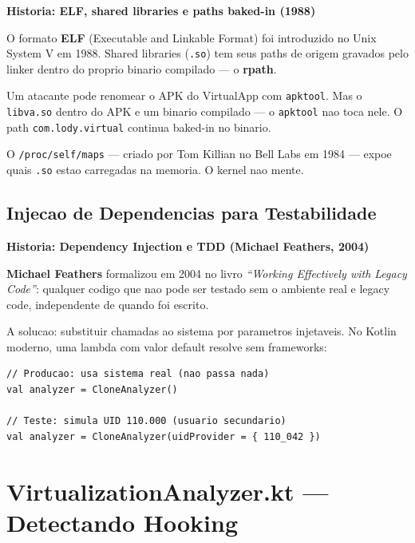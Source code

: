 \documentclass[12pt,a4paper]{article}
\begin{document}
\begin{historybox}
\textbf{Historia: ELF, shared libraries e paths baked-in (1988)}

O formato \textbf{ELF} (Executable and Linkable Format) foi introduzido
no Unix System V em 1988. Shared libraries (\texttt{.so}) tem seus paths
de origem gravados pelo linker dentro do proprio binario compilado --- o \textbf{rpath}.

Um atacante pode renomear o APK do VirtualApp com \texttt{apktool}.
Mas o \texttt{libva.so} dentro do APK e um binario compilado --- o \texttt{apktool}
nao toca nele. O path \texttt{com.lody.virtual} continua baked-in no binario.

O \texttt{/proc/self/maps} --- criado por Tom Killian no Bell Labs em 1984 ---
expoe quais \texttt{.so} estao carregadas na memoria. O kernel nao mente.
\end{historybox}

\subsection{Injecao de Dependencias para Testabilidade}

\begin{historybox}
\textbf{Historia: Dependency Injection e TDD (Michael Feathers, 2004)}

\textbf{Michael Feathers} formalizou em 2004 no livro \textit{``Working Effectively
with Legacy Code''}: qualquer codigo que nao pode ser testado sem o ambiente
real e legacy code, independente de quando foi escrito.

A solucao: substituir chamadas ao sistema por parametros injetaveis.
No Kotlin moderno, uma lambda com valor default resolve sem frameworks:

\begin{lstlisting}
// Producao: usa sistema real (nao passa nada)
val analyzer = CloneAnalyzer()

// Teste: simula UID 110.000 (usuario secundario)
val analyzer = CloneAnalyzer(uidProvider = { 110_042 })
\end{lstlisting}
\end{historybox}

\newpage

\section{VirtualizationAnalyzer.kt --- Detectando Hooking}
\end{document}
